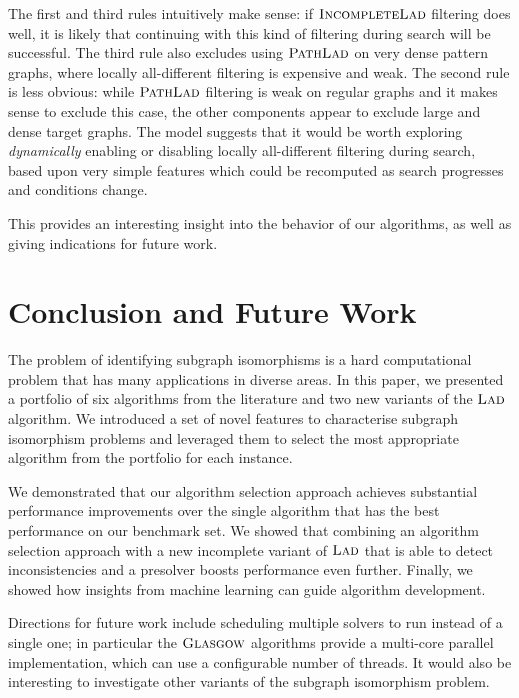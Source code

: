 \documentclass{llncs}
\newcommand{\Glasgow}{$\textsc{Glasgow}$\xspace}
\newcommand{\LAD}{$\textsc{Lad}$\xspace}
\newcommand{\IncompleteLAD}{$\textsc{IncompleteLad}$\xspace}
\newcommand{\PathLAD}{$\textsc{PathLad}$\xspace}
\begin{document}
\noindent
The first and third rules intuitively make sense: if \IncompleteLAD
filtering does well, it is likely that continuing with this kind of filtering
during search will be successful. The third rule also excludes using \PathLAD
on very dense pattern graphs, where locally all-different filtering is
expensive and weak. The second rule is less obvious: while \PathLAD filtering is
weak on regular graphs and it makes sense to exclude this case, the other
components appear to exclude large and dense target graphs. The model suggests
that it would be worth exploring \emph{dynamically} enabling or disabling
locally all-different filtering during search, based upon very simple features
which could be recomputed as search progresses and conditions change.

This provides an interesting insight into the behavior of our algorithms, as
well as giving indications for future work.

\section{Conclusion and Future Work}\label{sec:concs}

The problem of identifying subgraph isomorphisms is a hard computational problem that has many
applications in diverse areas. In this paper, we presented a portfolio of six algorithms from the
literature and two new variants of the \LAD algorithm. We introduced a set of novel features to
characterise subgraph isomorphism problems and leveraged them to select the most appropriate
algorithm from the portfolio for each instance.

We demonstrated that our algorithm selection approach achieves substantial
performance improvements over the single algorithm that has the best performance
on our benchmark set. We showed that combining an algorithm selection approach
with a new incomplete variant of \LAD that is able to detect inconsistencies
and a presolver boosts performance even further. Finally, we showed how
insights from machine learning can guide algorithm development.

Directions for future work include scheduling multiple solvers to run instead of
a single one; in particular the \Glasgow algorithms provide a multi-core
parallel implementation, which can use a configurable number of threads. It
would also be interesting to investigate other variants of the subgraph
isomorphism problem.



\end{document}
